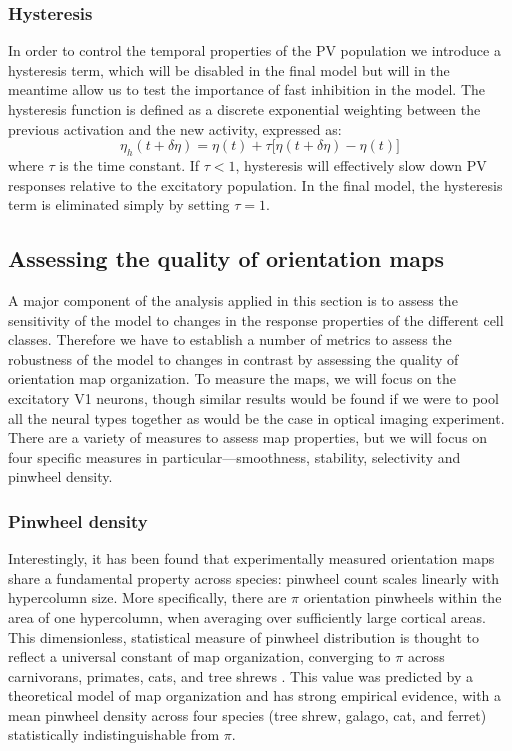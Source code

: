 \subsubsection*{Hysteresis}

In order to control the temporal properties of the PV population we
introduce a hysteresis term, which will be disabled in the final
model but will in the meantime allow us to test the importance of fast
inhibition in the model. The hysteresis function is defined as a discrete
exponential weighting between the previous activation and the new
activity, expressed as:
\begin{equation}
  \eta_h (t + \delta\eta) = \eta(t) + \tau \big[ \eta(t+\delta\eta) - \eta(t) \big]
\end{equation}
where $\tau$ is the time constant. If $\tau < 1$, hysteresis will
effectively slow down PV responses relative to the excitatory
population. In the final model, the hysteresis term is eliminated simply by
setting $\tau = 1$.

\subsection{Assessing the quality of orientation maps} \label{metrics}

A major component of the analysis applied in this section is to assess
the sensitivity of the model to changes in the response properties of
the different cell classes. Therefore we have to establish a number of
metrics to assess the robustness of the model to changes in contrast
by assessing the quality of orientation map organization.  To measure
the maps, we will focus on the excitatory V1 neurons, though similar
results would be found if we were to pool all the neural types
together as would be the case in optical imaging experiment.  There
are a variety of measures to assess map properties, but we will focus
on four specific measures in particular---smoothness, stability,
selectivity and pinwheel density.

\subsubsection*{Pinwheel density}

Interestingly, it has been found that experimentally measured
orientation maps share a fundamental property across species: pinwheel
count scales linearly with hypercolumn size.  More specifically,
there are $\pi$ orientation pinwheels within the area of one
hypercolumn, when averaging over sufficiently large cortical
areas. This dimensionless, statistical measure of pinwheel
distribution is thought to reflect a universal constant of map
organization, converging to $\pi$ across carnivorans, primates, cats, and
tree shrews \citep{Kaschube2010, Keil2012}. This value was predicted
by a theoretical model of map organization and has strong empirical
evidence, with a mean pinwheel density across four species (tree
shrew, galago, cat, and ferret) statistically indistinguishable from
$\pi$.

